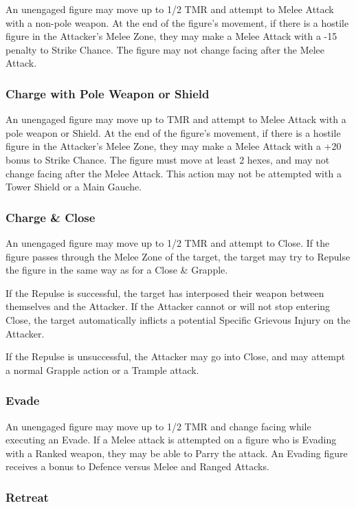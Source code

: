 \begin{multicols*}{3}
An unengaged figure may move up to 1/2 TMR and attempt to Melee Attack
with a non-pole weapon. At the end of the figure's movement, if there
is a hostile figure in the Attacker's Melee Zone, they may make a
Melee Attack with a -15 penalty to Strike Chance. The figure may not
change facing after the Melee Attack.

\subsubsection{Charge with Pole Weapon or Shield}

An unengaged figure may move up to TMR and attempt to Melee Attack
with a pole weapon or Shield. At the end of the figure's movement, if
there is a hostile figure in the Attacker's Melee Zone, they may make
a Melee Attack with a +20 bonus to Strike Chance. The figure must move
at least 2 hexes, and may not change facing after the Melee
Attack. This action may not be attempted with a Tower Shield or a Main
Gauche.

\subsubsection{Charge \& Close}

An unengaged figure may move up to 1/2 TMR and attempt to Close. If
the figure passes through the Melee Zone of the target, the target may
try to Repulse the figure in the same way as for a Close \& Grapple.

If the Repulse is successful, the target has interposed their weapon
between themselves and the Attacker. If the Attacker cannot or will
not stop entering Close, the target automatically inflicts a potential
Specific Grievous Injury on the Attacker.

If the Repulse is unsuccessful, the Attacker may go into Close, and
may attempt a normal Grapple action or a Trample attack.

\subsubsection{Evade}

An unengaged figure may move up to 1/2 TMR and change facing while
executing an Evade. If a Melee attack is attempted on a figure who is
Evading with a Ranked weapon, they may be able to Parry the attack. An
Evading figure receives a bonus to Defence versus Melee and Ranged
Attacks.

\subsubsection{Retreat}


\end{multicols*}
